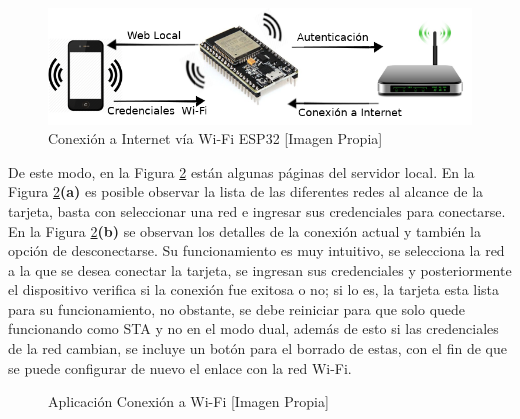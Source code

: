 \begin{figure}[H]
	\centering
	\caption{Conexión a Internet vía Wi-Fi ESP32 [Imagen Propia]}
	\label{fig:conexion}
	\includegraphics[width=0.7\linewidth]{Imagenes/conexion}
\end{figure}


De este modo, en la Figura \ref{fig:wifi} están algunas páginas del servidor local. En la Figura \ref{fig:wifi}\textbf{(a)} es posible observar la lista de las diferentes redes al alcance de la tarjeta, basta con seleccionar una red e ingresar sus credenciales para conectarse. En la Figura \ref{fig:wifi}\textbf{(b)} se observan los detalles de la conexión actual y también la opción de desconectarse. Su funcionamiento es muy intuitivo, se selecciona la red a la que se desea conectar la tarjeta, se ingresan sus credenciales y posteriormente el dispositivo verifica si la conexión fue exitosa o no; si lo es, la tarjeta esta lista para su funcionamiento, no obstante, se debe reiniciar para que solo quede funcionando como STA y no en el modo dual, además de esto si las credenciales de la red cambian, se incluye un botón para el borrado de estas, con el fin de que se puede configurar de nuevo el enlace con la red Wi-Fi.

\begin{figure}[H]
	\centering
	\caption{Aplicación Conexión a Wi-Fi [Imagen Propia]}
	\label{fig:wifi}
\end{figure}

